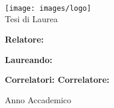%
%

\usepackage[\languages]{babel}
\usepackage[
  plainpages=false,
  pdfpagelabels,
  pdftitle={\mytitle},
  pagebackref,
  pdfauthor={\myauthor},
  pdfkeywords={\keywords}
]{hyperref}
\usepackage{memhfixc}



\title{\mytitle}
\author{\myauthor}

\ifx\mydate\undefined
\else
\date{\mydate}
\fi


\ifx\theme\undefined
\else
\usetheme{\theme}
\fi

\VerbatimFootnotes


\chapterstyle{\mychapterstyle}
\pagestyle{\mypagestyle}



\frontmatter
\thispagestyle{empty}

\noindent \begin{center}
  \textsc{\huge \university} \\
  \vspace{1.0cm}
  \textsc{\LARGE \faculty} \\
  {\large \course} \\
  \vspace{1.0cm}
  \texttt{[image: images/logo]} \\
  \vspace{0.5cm}
  {\Large Tesi di Laurea} \\
  \textbf{\huge \formattedtitle}
\end{center}

\vfill
\noindent \textbf{\Large Relatore:}

\noindent {\Large \enskip\supervisor}{\Large \hfill}\textbf{\Large Laureando:}

\noindent \textbf{\Large 
  \ifdefined\secondassistantsupervisor
    Correlatori:
  \else
    Correlatore:
  \fi
}{\Large \hfill}{\Large \myauthor\enskip}


\ifdefined\secondassistantsupervisor
  \noindent {\Large \enskip\secondassistantsupervisor}
\fi

\vfill

\noindent \begin{center}
  {\Large Anno Accademico \academicyear}
\end{center}

\clearpage

\setcounter{tocdepth}{\tocdepth}
\tableofcontents

\clearpage
\listoffigures



\mainmatter

